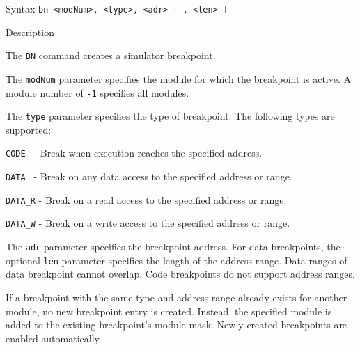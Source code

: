 %
%
\pagebreak
{}

\begin{iPageDescEntry}{Syntax}
\texttt{bn  <modNum>, <type>, <adr> [ , <len> ]  }
\end{iPageDescEntry}

\begin{iPageDescEntry}{Description}

The \texttt{BN} command creates a simulator breakpoint.

The \texttt{modNum} parameter specifies the module for which the
breakpoint is active. A module number of \texttt{-1} specifies all
modules.

The \texttt{type} parameter specifies the type of breakpoint. The
following types are supported:

\begin{smallGapItemize}
	\item \texttt{CODE  } - Break when execution reaches the specified address.
    \item \texttt{DATA  } - Break on any data access to the specified address or range.
    \item \texttt{DATA\_R} - Break on a read access to the specified address or range.
    \item \texttt{DATA\_W} - Break on a write access to the specified address or range.
\end{smallGapItemize}
 
The \texttt{adr} parameter specifies the breakpoint address. For data
breakpoints, the optional \texttt{len} parameter specifies the length
of the address range. Data ranges of data breakpoint cannot overlap. 
Code breakpoints do not support address ranges. 

If a breakpoint with the same type and address range already exists for
another module, no new breakpoint entry is created. Instead, the
specified module is added to the existing breakpoint's module mask.
Newly created breakpoints are enabled automatically.

\end{iPageDescEntry}

